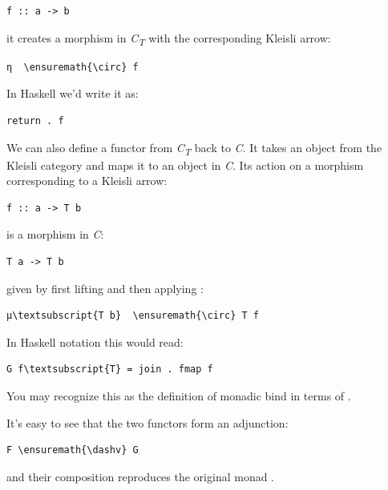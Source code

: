 \begin{Verbatim}[commandchars=\\\{\}]
f :: a -> b
\end{Verbatim}
it creates a morphism in \emph{C\textsubscript{T}} with the
corresponding Kleisli arrow:

\begin{Verbatim}[commandchars=\\\{\}]
η  \ensuremath{\circ} f
\end{Verbatim}
In Haskell we'd write it as:

\begin{Verbatim}[commandchars=\\\{\}]
return . f
\end{Verbatim}
We can also define a functor  from \emph{C\textsubscript{T}}
back to \emph{C}. It takes an object  from the Kleisli
category and maps it to an object  in \emph{C}. Its action
on a morphism  corresponding to a Kleisli arrow:

\begin{Verbatim}[commandchars=\\\{\}]
f :: a -> T b
\end{Verbatim}
is a morphism in \emph{C}:

\begin{Verbatim}[commandchars=\\\{\}]
T a -> T b
\end{Verbatim}
given by first lifting  and then applying :

\begin{Verbatim}[commandchars=\\\{\}]
μ\textsubscript{T b}  \ensuremath{\circ} T f
\end{Verbatim}
In Haskell notation this would read:

\begin{Verbatim}[commandchars=\\\{\}]
G f\textsubscript{T} = join . fmap f
\end{Verbatim}
You may recognize this as the definition of monadic bind in terms of
.

It's easy to see that the two functors form an adjunction:

\begin{Verbatim}[commandchars=\\\{\}]
F \ensuremath{\dashv} G
\end{Verbatim}
and their composition  reproduces the original monad
.

